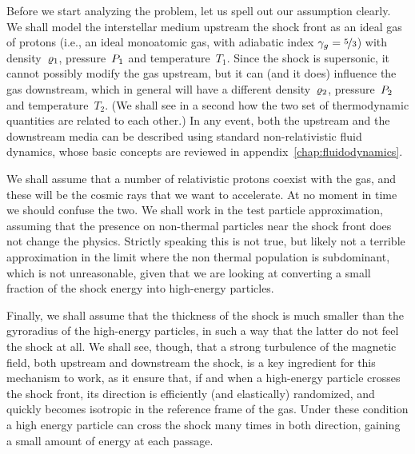 Before we start analyzing the problem, let us spell out our assumption clearly.
We shall model the interstellar medium upstream the shock front as an ideal gas of protons
(i.e., an ideal monoatomic gas, with adiabatic index $\gamma_g = \nicefrac{5}{3}$)
with density~$\varrho_1$, pressure~$P_1$ and temperature~$T_1$. Since
the shock is supersonic, it cannot possibly modify the gas upstream, but it can
(and it does) influence the gas downstream, which in general will have a different
density~$\varrho_2$, pressure~$P_2$ and temperature~$T_2$. (We shall see
in a second how the two set of thermodynamic quantities are related to each other.)
In any event, both the upstream and the downstream media can be described using
standard non-relativistic fluid dynamics, whose basic concepts are reviewed in
appendix~\ref{chap:fluidodynamics}.

We shall assume that a number of relativistic
protons coexist with the gas, and these will be the cosmic rays that we
want to accelerate. At no moment in time we should confuse the two. We shall work
in the test particle approximation, assuming that the presence on non-thermal
particles near the shock front does not change the physics. Strictly speaking this
is not true, but likely not a terrible approximation in the limit where the non
thermal population is subdominant, which is not unreasonable, given that we are
looking at converting a small fraction of the shock energy into high-energy particles.

Finally, we shall assume that the thickness of the shock is much smaller than the
gyroradius of the high-energy particles, in such a way that the latter do not
feel the shock at all. We shall see, though, that a strong turbulence of the magnetic
field, both upstream and downstream the shock, is a key ingredient for this mechanism
to work, as it ensure that, if and when a high-energy particle crosses the shock
front, its direction is efficiently (and elastically) randomized, and quickly becomes
isotropic in the reference frame of the gas. Under these condition a high energy
particle can cross the shock many times in both direction, gaining a small amount
of energy at each passage.

\begin{marginfigure}
  
  \caption{Schematic view of a parallel shock in the reference frame where the
  shock front is at rest.}
  \label{fig:shock_cartoon_front}
\end{marginfigure}

